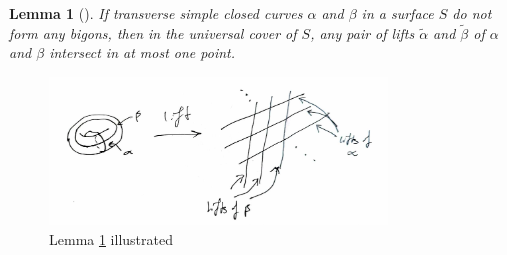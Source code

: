 \documentclass[reqno]{amsart}
\newtheorem{lemma}[theorem]{Lemma}
\theoremstyle{definition}
\theoremstyle{remark}
\begin{document}
\begin{lemma}[]\label{lemma-intersections-of-lifts}
    If transverse simple closed curves $\alpha$ and $\beta$ in
    a surface $S$ do not form any bigons, then in the
    universal cover of $S$, any pair of lifts
    $\tilde{\alpha}$ and $\tilde{\beta}$ of $\alpha$ and $\beta$ 
    intersect in at most one point.
\end{lemma}


\begin{figure}[h]
    \centering
    \includegraphics[width=0.8\textwidth]{lemma-1-8.jpg}
    \caption{Lemma \ref{lemma-intersections-of-lifts} illustrated}
    \label{fig:lemma-1-8-jpg}
\end{figure}
\end{document}
